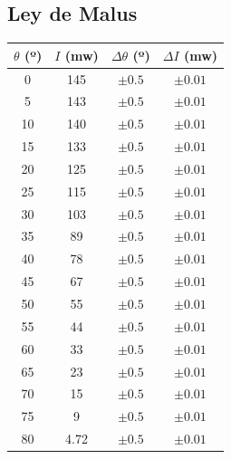 \documentclass[11pt, a4paper, twocolumn]{article}
\begin{document}
\vspace{0.3cm}

\subsection{Ley de Malus}

\begin{table}[H]
    \centering
    \small
    \begin{tabular}{cccc}
        \hline
        $\theta$ (º) &   $I$ (mw) & $\Delta \theta$ (º)   & $\Delta I$ (mw)   \\
        \hline
                    0 &     145    & $\pm 0.5$             & $\pm 0.01$        \\
                    5 &     143    & $\pm 0.5$             & $\pm 0.01$        \\
                    10 &     140    & $\pm 0.5$             & $\pm 0.01$        \\
                    15 &     133    & $\pm 0.5$             & $\pm 0.01$        \\
                    20 &     125    & $\pm 0.5$             & $\pm 0.01$        \\
                    25 &     115    & $\pm 0.5$             & $\pm 0.01$        \\
                    30 &     103    & $\pm 0.5$             & $\pm 0.01$        \\
                    35 &      89    & $\pm 0.5$             & $\pm 0.01$        \\
                    40 &      78    & $\pm 0.5$             & $\pm 0.01$        \\
                    45 &      67    & $\pm 0.5$             & $\pm 0.01$        \\
                    50 &      55    & $\pm 0.5$             & $\pm 0.01$        \\
                    55 &      44    & $\pm 0.5$             & $\pm 0.01$        \\
                    60 &      33    & $\pm 0.5$             & $\pm 0.01$        \\
                    65 &      23    & $\pm 0.5$             & $\pm 0.01$        \\
                    70 &      15    & $\pm 0.5$             & $\pm 0.01$        \\
                    75 &       9    & $\pm 0.5$             & $\pm 0.01$        \\
                    80 &       4.72 & $\pm 0.5$             & $\pm 0.01$        \\

\end{tabular}
\end{table}
\end{document}
